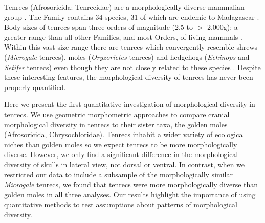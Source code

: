 \documentclass[12pt,a4paper]{article}
\begin{document}

	Tenrecs (Afrosoricida: Tenrecidae) are a morphologically diverse mammalian group \citep{Soarimalala2011, Olson2003}. The Family contains 34 species, 31 of which are endemic to Madagascar \citep{Olson2013}. Body sizes of tenrecs span three orders of magnitude (2.5 to $>$ 2,000g); a greater range than all other Families, and most Orders, of living mammals \citep{Olson2003}. Within this vast size range there are tenrecs which convergently resemble shrews (\textit{Microgale} tenrecs), moles (\textit{Oryzorictes} tenrecs) and hedgehogs (\textit{Echinops} and \textit{Setifer} tenrecs) \citep{Eisenberg1969} even though they are not closely related to these species \citep{Stanhope1998}. Despite these interesting features, the morphological diversity of tenrecs has never been properly quantified.



	Here we present the first quantitative investigation of morphological diversity in tenrecs. We use geometric morphometric approaches to compare cranial morphological diversity in tenrecs to their sister taxa, the golden moles (Afrosoricida, Chrysochloridae). 
	Tenrecs inhabit a wider variety of ecological niches than golden moles \citep{Soarimalala2011, Bronner1995} so we expect tenrecs to be more morphologically diverse. However, we only find a significant difference in the morphological diversity of skulls in lateral view, not dorsal or ventral. In contrast, when we restricted our data to include a subsample of the morphologically similar \textit{Microgale} tenrecs, we found that tenrecs were more morphologically diverse than golden moles in all three analyses.
	Our results highlight the importance of using quantitative methods to test assumptions about patterns of morphological diversity.
\end{document}

